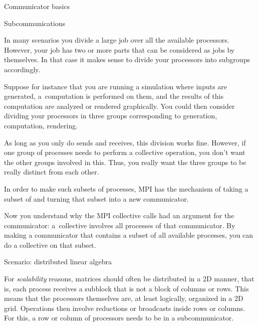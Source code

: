 
 {Communicator basics}
\label{sec:comm-basic}



 {Subcommunications}
\label{sec:communicators}

In many scenarios you divide a large job over all the available processors.
However, your job has two or more parts that can be considered as
jobs by themselves. In that case it makes sense to divide your processors
into subgroups accordingly.

Suppose for instance that you are running a simulation where inputs are generated,
a~computation is performed on them, and the results of this computation
are analyzed or rendered graphically. You could then consider dividing your
processors in three groups corresponding to generation, computation, rendering.

As long as you only do sends and receives, this division works fine. However,
if one group of processes needs to perform a collective operation, you don't
want the other groups involved in this. Thus, you really want the three groups
to be really distinct from each other.

In order to make such subsets of processes, MPI has the mechanism of
taking a subset of  and turning that subset
into a new communicator.

Now you understand why the MPI collective calls had an argument for the
communicator: a~collective involves all processes of that communicator.
By making a communicator that contains a subset of all available processes,
you can do a collective on that subset.

 {Scenario: distributed linear algebra}

For \emph{scalability} reasons, matrices should often be distributed
in a 2D manner, that is, each process receives a subblock that is not
a block of columns or rows. This means that the processors themselves
are, at least logically, organized in a 2D grid. Operations
then involve reductions or broadcasts inside rows or columns. For
this, a row or column of processors needs to be in a subcommunicator.

